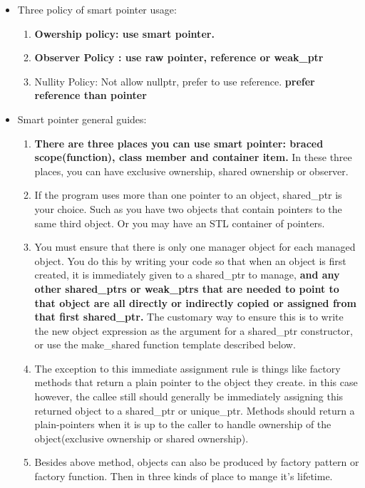 \documentclass[a4paper,12pt,twoside]{book}
\begin{document}
\begin{itemize}
\item Three policy of smart pointer usage:
\begin{enumerate}
	\item \textbf{Owership policy: use smart pointer.}
	\item \textbf{Observer Policy : use raw pointer, reference or weak\_ptr}
	\item Nullity Policy: Not allow nullptr, prefer to use reference. \textbf{prefer reference than pointer}
\end{enumerate}

\item Smart pointer general guides:
\begin{enumerate}
\item \textbf{There are three places you can use smart pointer: braced scope(function), class member and container item.} In these three places, you can have exclusive ownership, shared ownership or observer.

\item If the program uses more than one pointer to an object, shared\_ptr is your choice.  Such as you have two objects that contain pointers to the same third object. Or you may have an STL container of pointers.

\item You must ensure that there is only one manager object for each managed object. You do this by writing your code so that when an object is first created, it is immediately given to a shared\_ptr to manage, \textbf{and any other shared\_ptrs or weak\_ptrs that are needed to point to that object are all directly or indirectly copied or assigned from that first shared\_ptr.} The customary way to ensure this is to write the new object expression as the argument for a shared\_ptr constructor, or use the make\_shared function template described below.

\item The exception to this immediate assignment rule is things like factory methods that return a plain pointer to the object they create. in this case however, the callee still should generally be immediately assigning this returned object to a shared\_ptr or unique\_ptr.  Methods should return a plain-pointers when it is up to the caller to handle ownership of the object(exclusive ownership or shared ownership).

\item Besides above method, objects can also be produced by factory pattern or factory function. Then in three kinds of place to mange it's lifetime. 


\end{enumerate}
\end{itemize}
\end{document}
